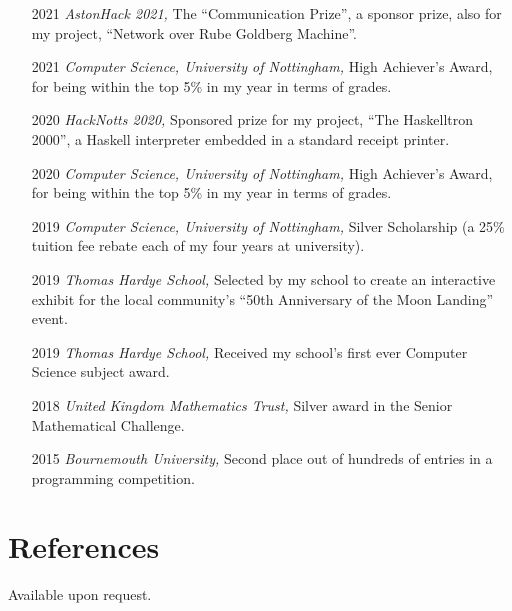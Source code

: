 \documentclass[12pt]{article}
\begin{document}
\begin{itemize}
	\item[2021] \textit{AstonHack 2021,} The ``Communication Prize'', a sponsor prize, also for my project, ``Network over Rube Goldberg Machine''.
	\item[2021] \textit{Computer Science, University of Nottingham,} High Achiever's Award, for being within the top 5\% in my year in terms of grades.
	\item[2020] \textit{HackNotts 2020,} Sponsored prize for my project, ``The Haskelltron 2000'', a Haskell interpreter embedded in a standard receipt printer.
	\item[2020] \textit{Computer Science, University of Nottingham,} High Achiever's Award, for being within the top 5\% in my year in terms of grades.
	\item[2019] \textit{Computer Science, University of Nottingham,} Silver Scholarship (a 25\% tuition fee rebate each of my four years at university).
	\item[2019] \textit{Thomas Hardye School,} Selected by my school to create an interactive exhibit for the local community's ``50th Anniversary of the Moon Landing'' event.
	\item[2019] \textit{Thomas Hardye School,} Received my school's first ever Computer Science subject award.
	\item[2018] \textit{United Kingdom Mathematics Trust,} Silver award in the Senior Mathematical Challenge.
	\item[2015] \textit{Bournemouth University,} Second place out of hundreds of entries in a programming competition.
\end{itemize}

\section*{References}
Available upon request.

\vfill
\end{document}
